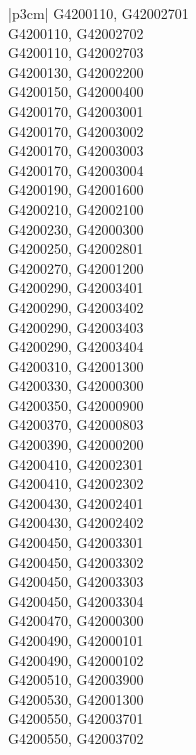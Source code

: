 \begin{customLongTable}{ |p{3cm}| }
G4200110, G42002701 \\ \hline
G4200110, G42002702 \\ \hline
G4200110, G42002703 \\ \hline
G4200130, G42002200 \\ \hline
G4200150, G42000400 \\ \hline
G4200170, G42003001 \\ \hline
G4200170, G42003002 \\ \hline
G4200170, G42003003 \\ \hline
G4200170, G42003004 \\ \hline
G4200190, G42001600 \\ \hline
G4200210, G42002100 \\ \hline
G4200230, G42000300 \\ \hline
G4200250, G42002801 \\ \hline
G4200270, G42001200 \\ \hline
G4200290, G42003401 \\ \hline
G4200290, G42003402 \\ \hline
G4200290, G42003403 \\ \hline
G4200290, G42003404 \\ \hline
G4200310, G42001300 \\ \hline
G4200330, G42000300 \\ \hline
G4200350, G42000900 \\ \hline
G4200370, G42000803 \\ \hline
G4200390, G42000200 \\ \hline
G4200410, G42002301 \\ \hline
G4200410, G42002302 \\ \hline
G4200430, G42002401 \\ \hline
G4200430, G42002402 \\ \hline
G4200450, G42003301 \\ \hline
G4200450, G42003302 \\ \hline
G4200450, G42003303 \\ \hline
G4200450, G42003304 \\ \hline
G4200470, G42000300 \\ \hline
G4200490, G42000101 \\ \hline
G4200490, G42000102 \\ \hline
G4200510, G42003900 \\ \hline
G4200530, G42001300 \\ \hline
G4200550, G42003701 \\ \hline
G4200550, G42003702 \\ \hline

\end{customLongTable}
